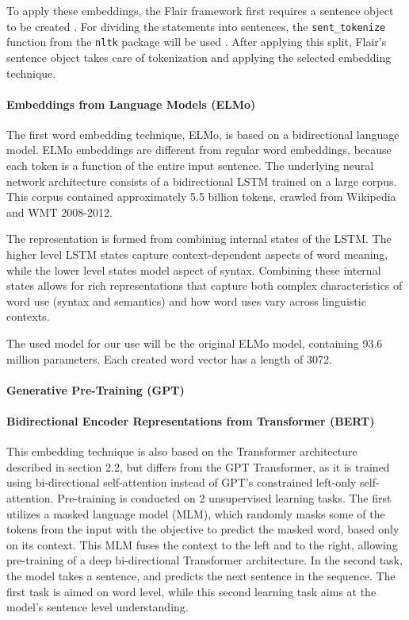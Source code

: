To apply these embeddings, the Flair framework first requires a sentence object to be created \cite{flairsentence}.
For dividing the statements into sentences, the \texttt{sent\_tokenize} function from the \texttt{nltk} package will be used \cite{nltktokenize}. 
After applying this split, Flair's sentence object takes care of tokenization and applying the selected embedding technique.

\paragraph{Embeddings from Language Models (ELMo)}
The first word embedding technique, ELMo, is based on a bidirectional language model. 
ELMo embeddings are different from regular word embeddings, because each token is a function of the entire input sentence.
The underlying neural network architecture consists of a bidirectional LSTM trained on a large corpus.
This corpus contained approximately 5.5 billion tokens, crawled from Wikipedia and WMT 2008-2012.

The representation is formed from combining internal states of the LSTM. 
The higher level LSTM states capture context-dependent aspects of word meaning, while the lower level states model aspect of syntax.
Combining these internal states allows for rich representations that capture both complex characteristics of word use (syntax and semantics) and how word uses vary across linguistic contexts\cite{peters2018}.

The used model for our use will be the original ELMo model, containing 93.6 million parameters.
Each created word vector has a length of 3072. 

\paragraph{Generative Pre-Training (GPT)}

\paragraph{Bidirectional Encoder Representations from Transformer (BERT)}
This embedding technique is also based on the Transformer architecture described in section 2.2, but differs from the GPT Transformer, as it is trained using bi-directional self-attention instead of GPT's constrained left-only self-attention.
Pre-training is conducted on 2 unsupervised learning tasks. 
The first utilizes a masked language model (MLM), which randomly masks some of the tokens from the input with the objective to predict the masked word, based only on its context.
This MLM fuses the context to the left and to the right, allowing pre-training of a deep bi-directional Transformer architecture.
In the second task, the model takes a sentence, and predicts the next sentence in the sequence. 
The first task is aimed on word level, while this second learning task aims at the model's sentence level understanding. 

